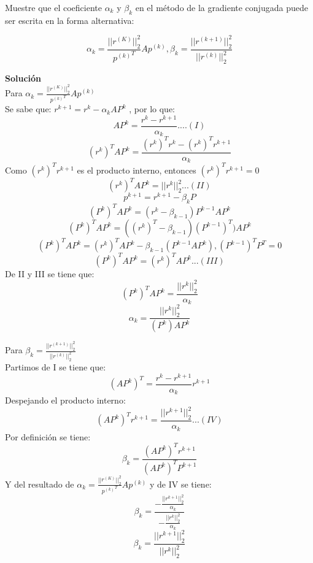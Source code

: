 Muestre que el coeficiente $\alpha_k$  y $\beta_k$ en el método de la gradiente conjugada puede ser escrita en la forma alternativa:

\[\alpha_k=\frac{||r^{(K)}||_2^2}{{p^{(k)}}^T}Ap^{(k)} , \beta_k=\frac{||r^{(k+1)}||_2^2}{||r^{(k)}||_2^2} \]

\textbf{Solución}\\
Para $\alpha_k=\frac{||r^{(K)}||_2^2}{{p^{(k)}}^T}Ap^{(k)}$\\
Se sabe que: $r^{k+1} = r^k - \alpha_k AP^{k} $ , por lo que:\\
\[AP^k = \frac{r^k - r^{k+1}}{\alpha_k} ....(I)\]
\[(r^k)^T AP^k = \frac{(r^k)^T r^k - (r^k)^T r^{k+1}}{\alpha_k}\]
Como $(r^k)^T r^{k+1}$ es el producto interno, entonces $(r^k)^T r^{k+1}=0$
\[(r^k)^T AP^k = || r^k ||_2^2 ...(II)\]
\[p^{k+1} = r^{k+1} - \beta_k P\]
\[(P^k)^T AP^k = (r^k - \beta_{k-1})P^{k-1} AP^k\]
\[(P^k)^T AP^k = ((r^k)^T - \beta_{k-1})(P^{k-1})^T)AP^k\]
\[(P^k)^T AP^k = (r^k)^T AP^k - \beta_{k-1}(P^{k-1} AP^k) , (P^{k-1})^T P^T = 0\]
\[(P^k)^T AP^k = (r^k)^T AP^k ...(III)\]
De II y III se tiene que:\\
\[(P^k)^T AP^k = \frac{||r^k||_2^2}{\alpha_k}\]
\[\alpha_k = \frac{||r^k||_2^2}{(P^k) AP^k}\]

Para $\beta_k=\frac{||r^{(k+1)}||_2^2}{||r^{(k)}||_2^2} $\\
Partimos de I se tiene que:
\[(AP^k)^T = \frac{r^k - r^{k+1}}{\alpha_k} r^{k+1}\]
Despejando el producto interno:
\[(AP^k)^T r^{k+1} = \frac{||r^{k+1}||_2^2}{\alpha_k}  ...(IV)\]
Por definición se tiene:
\[\beta_k = \frac{(AP^k)^T r^{k+1}}{(AP^k)^T P^{k+1}}\]
Y del resultado de $\alpha_k=\frac{||r^{(K)}||_2^2}{{p^{(k)}}^T}Ap^{(k)}$ y de IV se tiene:
\[\beta_k = \frac{-\frac{||r^{k+1}||_2^2}{\alpha_k}}{-\frac{||r^k||_2^2}{\alpha_k}}\]
\[\beta_k = \frac{|| r^{k+1} ||_2^2}{||r^k||_2^2}\]
